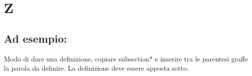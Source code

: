 \section*{Z}
\markright{}

\subsection*{Ad esempio:}
Modo di dare una definizione, copiare subsection*{} e inserire tra le parentesi graffe la parola da definire. La definizione deve essere apposta sotto.